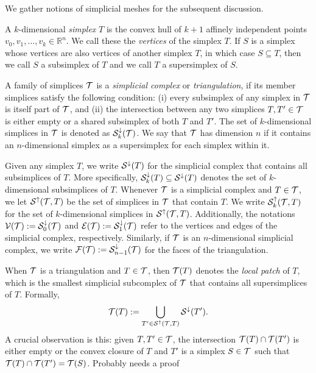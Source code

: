 \documentclass[a4paper]{article}
\begin{document}
We gather notions of simplicial meshes for the subsequent discussion. 

A ${k}$-dimensional \emph{simplex} $T$ is the convex hull of ${k}+1$ affinely independent points $v_0, v_1, \ldots, v_{{k}} \in \mathbb{R}^{n}$. We call these the \emph{vertices} of the simplex $T$. 
If $S$ is a simplex whose vertices are also vertices of another simplex $T$, in which case $S \subseteq T$, 
then we call $S$ a subsimplex of $T$ and we call $T$ a supersimplex of $S$. 

A family of simplices ${\mathcal T}$ is a \emph{simplicial complex} or \emph{triangulation}, if its member simplices satisfy the following condition: 
(i) every subsimplex of any simplex in ${\mathcal T}$ is itself part of ${\mathcal T}$, and (ii) the intersection between any two simplices $T, T' \in {\mathcal T}$ is either empty or a shared subsimplex of both $T$ and $T'$. 
The set of $k$-dimensional simplices in ${\mathcal T}$ is denoted as ${\mathcal S}^{\downarrow}_{{k}}({\mathcal T})$. 
We say that ${\mathcal T}$ has dimension $n$ if it contains an $n$-dimensional simplex as a supersimplex for each simplex within it. 

Given any simplex $T$, we write ${\mathcal S}^{\downarrow}(T)$ for the simplicial complex that contains all subsimplices of $T$. 
More specifically, ${\mathcal S}^{\downarrow}_{{k}}(T) \subseteq {\mathcal S}^{\downarrow}(T)$ denotes the set of $k$-dimensional subsimplices of $T$. 
Whenever ${\mathcal T}$ is a simplicial complex and $T \in {\mathcal T}$, we let ${\mathcal S}^{\uparrow}({\mathcal T},T)$ be the set of simplices in ${\mathcal T}$ that contain $T$.
We write ${\mathcal S}^{\uparrow}_{k}({\mathcal T},T)$ for the set of $k$-dimensional simplices in ${\mathcal S}^{\uparrow}({\mathcal T},T)$. 
Additionally, the notations ${\mathcal V}({\mathcal T}) := {\mathcal S}^{\downarrow}_{0}({\mathcal T})$ and ${\mathcal E}({\mathcal T}) := {\mathcal S}^{\downarrow}_{1}({\mathcal T})$ refer to the vertices and edges of the simplicial complex, respectively. Similarly, if ${\mathcal T}$ is an $n$-dimensional simplicial complex, we write ${\mathcal F}({\mathcal T}) := {\mathcal S}^{\downarrow}_{n-1}({\mathcal T})$ for the faces of the triangulation. 

When ${\mathcal T}$ is a triangulation and $T \in {\mathcal T}$, then ${\mathcal T}(T)$ denotes the \emph{local patch} of $T$, which is the smallest simplicial subcomplex of ${\mathcal T}$ that contains all supersimplices of $T$. Formally,
\begin{gather*}
    {\mathcal T}(T) := \bigcup_{ T' \in {\mathcal S}^{\uparrow}({\mathcal T},T) } {\mathcal S}^{\downarrow}(T').
\end{gather*}
A crucial observation is this: 
given $T, T' \in {\mathcal T}$, the intersection ${\mathcal T}(T) \cap {\mathcal T}(T')$ is either empty or the convex closure of $T$ and $T'$ is a simplex $S \in {\mathcal T}$ such that ${\mathcal T}(T) \cap {\mathcal T}(T') = {\mathcal T}(S)$. 
\color{red}Probably needs a proof\color{black}
\end{document}
